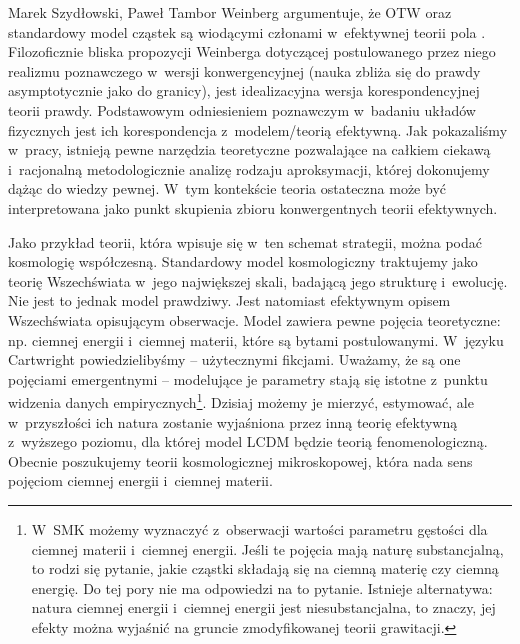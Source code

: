 \begin{artplenv2auth}{Marek Szydłowski, Paweł Tambor}
Weinberg argumentuje, że OTW oraz standardowy model cząstek są wiodącymi członami w~efektywnej teorii pola
\parencite[][]{weinberg_effective_2016}. %
 Filozoficznie bliska propozycji Weinberga dotyczącej postulowanego przez niego realizmu poznawczego w~wersji konwergencyjnej (nauka zbliża się do prawdy asymptotycznie jako do granicy), jest idealizacyjna wersja korespondencyjnej teorii prawdy. Podstawowym odniesieniem poznawczym w~badaniu układów fizycznych jest ich korespondencja z~modelem/teorią efektywną. Jak pokazaliśmy w~pracy, istnieją pewne narzędzia teoretyczne pozwalające na całkiem ciekawą i~racjonalną metodologicznie analizę rodzaju aproksymacji, której dokonujemy dążąc do wiedzy pewnej. W~tym kontekście teoria ostateczna może być interpretowana jako punkt skupienia zbioru konwergentnych teorii efektywnych.

Jako przykład teorii, która wpisuje się w~ten schemat strategii, można podać kosmologię współczesną. Standardowy model kosmologiczny traktujemy jako teorię Wszechświata w~jego największej skali, badającą jego strukturę i~ewolucję. Nie jest to jednak model prawdziwy. Jest natomiast efektywnym opisem Wszechświata opisującym obserwacje. Model zawiera pewne pojęcia teoretyczne: np. ciemnej energii i~ciemnej materii, które są bytami postulowanymi. W~języku Cartwright powiedzielibyśmy -- użytecznymi fikcjami. Uważamy, że są one pojęciami emergentnymi -- modelujące je parametry stają się istotne z~punktu widzenia danych empirycznych\footnote{W~SMK możemy wyznaczyć z~obserwacji wartości parametru gęstości dla ciemnej materii i~ciemnej energii. Jeśli te pojęcia mają naturę substancjalną, to rodzi się pytanie, jakie cząstki składają się na ciemną materię czy ciemną energię. Do tej pory nie ma odpowiedzi na to pytanie. Istnieje alternatywa: natura ciemnej energii i~ciemnej energii jest niesubstancjalna, to znaczy, jej efekty można wyjaśnić na gruncie zmodyfikowanej teorii grawitacji.}. Dzisiaj możemy je mierzyć, estymować, ale w~przyszłości ich natura zostanie wyjaśniona przez inną teorię efektywną z~wyższego poziomu, dla której model LCDM będzie teorią fenomenologiczną. Obecnie poszukujemy teorii kosmologicznej mikroskopowej, która nada sens pojęciom ciemnej energii i~ciemnej materii.


\end{artplenv2auth}
